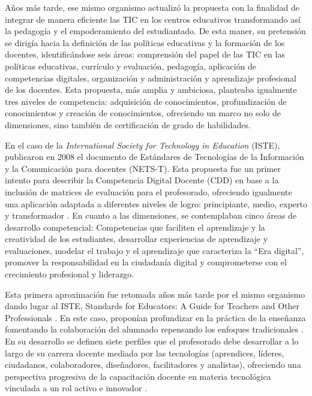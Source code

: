 \documentclass[spanish]{textolivre}
\begin{document}
Años más tarde, ese mismo organismo actualizó la propuesta \cite{butcher_marco_2019} con la finalidad de integrar de manera eficiente las TIC en los centros educativos transformando así la pedagogía y el empoderamiento del estudiantado. De esta maner, su pretensión se dirigía hacia la definición de las políticas educativas y la formación de los docentes, identificándose seis áreas: comprensión del papel de las TIC en las políticas educativas, currículo y evaluación, pedagogía, aplicación de competencias digitales, organización y administración y aprendizaje profesional de los docentes. Esta propuesta, más amplia y ambiciosa, planteaba igualmente tres niveles de competencia: adquisición de conocimientos, profundización de conocimientos y creación de conocimientos, ofreciendo un marco no solo de dimensiones, sino también de certificación de grado de habilidades.

En el caso de la \emph{International Society for Technology in Education} (ISTE), publicaron en 2008 el documento de Estándares de Tecnologías de la Información y la Comunicación para docentes (NETS-T). Esta propuesta fue un primer intento para describir la Competencia Digital Docente (CDD) en base a la inclusión de matrices de evaluación para el profesorado, ofreciendo igualmente una aplicación adaptada a diferentes niveles de logro: principiante, medio, experto y transformador \cite{gabarda_mendez_profesorado_2021}. En cuanto a las dimensiones, se contemplaban cinco áreas de desarrollo competencial: Competencias que faciliten el aprendizaje y la creatividad de los estudiantes, desarrollar experiencias de aprendizaje y evaluaciones, modelar el trabajo y el aprendizaje que caracteriza la “Era digital”, promover la responsabilidad en la ciudadanía digital y comprometerse con el crecimiento profesional y liderazgo.

Esta primera aproximación fue retomada años más tarde por el mismo organismo dando lugar al ISTE, Standards for Educators: A Guide for Teachers and Other Professionals \cite{crompton_iste_2017}. En este caso, proponían profundizar en la práctica de la enseñanza fomentando la colaboración del alumnado repensando los enfoques tradicionales \cite{caberoet-almenara_marcos_2020}. En su desarrollo se definen siete perfiles que el profesorado debe desarrollar a lo largo de su carrera docente mediada por las tecnologías (aprendices, líderes, ciudadanos, colaboradores, diseñadores, facilitadores y analistas), ofreciendo una perspectiva progresiva de la capacitación docente en materia tecnológica vinculada a un rol activo e innovador \cite{gutierrez2017diseno}.
\end{document}
